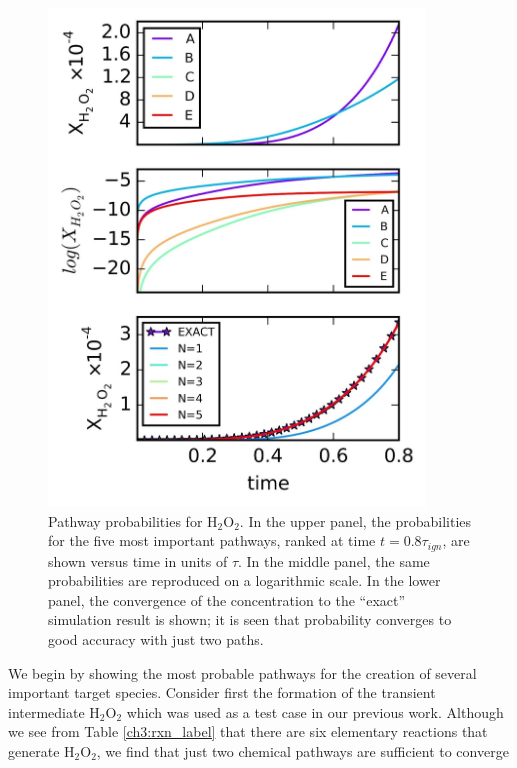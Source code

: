\paragraph{}
\begin{figure}[htbp]
	\caption[Pathway probabilities for H$_2$O$_2$ of H$_2$-O$_2$ combustion system]{Pathway probabilities for H$_2$O$_2$. In the upper panel, the probabilities for the five most important pathways, ranked at time $t=0.8\tau_{ign}$, are shown versus time in units of $\tau$. In the middle panel, the same probabilities are reproduced on a logarithmic scale. In the lower panel, the convergence of the concentration to the “exact” simulation result is shown; it is seen that probability converges to good accuracy
with just two paths.}
    \begin{center}
	\includegraphics[width=100mm]{figs/chapter3/fig6.jpg}
    \end{center}
\label{ch3:fig6}
\end{figure}
We begin by showing the most probable pathways for the
creation of several important target species. Consider first the
formation of the transient intermediate H$_2$O$_2$ which was used
as a test case in our previous work. Although we see from Table
\ref{ch3:rxn_label} that there are six elementary reactions that generate H$_2$O$_2$, we
find that just two chemical pathways are sufficient to converge
